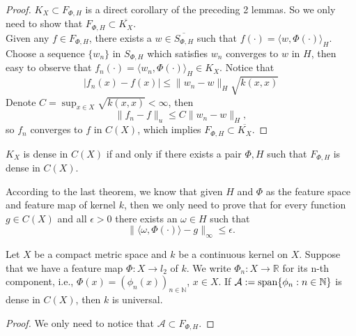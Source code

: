 \begin{proof}
	$K_X \subset F_{\Phi,H} $ is a direct corollary of the preceding 2 lemmas. So we only need to show that $F_{\Phi,H} \subset \overline{K_X}$.\\
	Given any $f\in F_{\Phi,H}$, there exists a $w\in \overline{S_{\Phi,H}}$ such that $f(\cdot) = \langle w,\Phi(\cdot) \rangle_H$. Choose a sequence $\{w_n\}$ in $S_{\Phi,H}$ which satisfies $w_n$ converges to $w$ in $H$, then easy to observe that $f_n(\cdot) = \langle w_n,\Phi(\cdot) \rangle_H\in K_X$. Notice that
	\begin{equation}
		|f_n(x) - f(x)| \leq \|w_n - w\|_H \sqrt{k(x,x)}
	\end{equation}
	Denote $C = \sup_{x\in X} \sqrt{k(x,x)} < \infty$, then 
	\begin{equation}
		\|f_n - f\|_{u} \leq C \|w_n - w\|_H,
	\end{equation}
	so $f_n$ converges to $f$ in $C(X)$, which implies $F_{\Phi,H} \subset \overline{K_X}$.
\end{proof}

\begin{corollary}
	$K_X$ is dense in $C(X)$ if and only if there exists a pair $\Phi,H$ such that $F_{\Phi,H}$ is dense in $C(X)$.
\end{corollary}



According to the last theorem, we know that given $H$ and $\Phi$ as the feature space and feature map of kernel $k$, then we only need to prove that for every function $g\in C(X)$ and all $\epsilon>0$ there exists an $\omega\in H$ such that 
\begin{equation}
\|\langle \omega,\Phi(\cdot) \rangle - g\|_{\infty} \leq \epsilon.
\end{equation} 



\begin{theorem}
	Let $X$ be a compact metric space and $k$ be a continuous kernel on $X$. Suppose that we have a feature map $\Phi: X\rightarrow l_2$ of $k$. We write $\Phi_n: X\rightarrow \mathbb{R}$ for its n-th component, i.e., $\Phi(x) = (\phi_n(x))_{n\in \mathbb{N}}$, $x\in X$. If $\mathcal{A}:= {\rm span} \{\phi_n: n\in \mathbb{N}\}$ is dense in $C(X)$, then $k$ is universal.
\end{theorem}

\begin{proof}
	We only need to notice that  $\mathcal{A}\subset F_{\Phi,H} $.
\end{proof}



